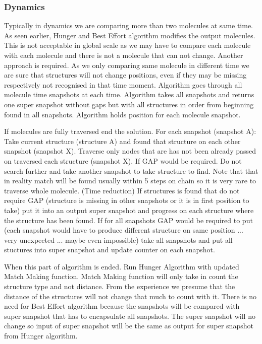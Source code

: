\documentclass[twocolumn]{bmcart}%
\begin{document}
\subsubsection{Dynamics}
Typically in dynamics we are comparing more than two molecules at same time. As seen earlier, Hunger and Best Effort algorithm modifies the output molecules. This is not acceptable in global scale as we may have to compare each molecule with each molecule and there is not a molecule that can not change. Another approach is required. As we only comparing same molecule in different time we are sure that structures will not change positions, even if they may be missing respectively not recognised in that time moment. Algorithm goes through all molecule time snapshots at each time. Algorithm takes all snapshots and returns one super snapshot without gaps but with all structures in order from beginning found in all snapshots. Algorithm holds position for each molecule snapshot.

If molecules are fully traversed end the solution.
For each snapshot (snapshot A):
Take current structure (structure A) and found that structure on each other snapshot (snapshot X). Traverse only nodes that are has not been already passed on traversed each structure (snapshot X). 
If GAP would be required. Do not search further and take another snapshot to take structure to find. Note that that in reality match will be found usually within 5 steps on chain so it is very rare to traverse whole molecule. (Time reduction)
If structures is found that do not require GAP (structure is missing in other snapshots or it is in first position to take) put it into an output super snapshot and progress on each structure where the structure has been found.
If for all snapshots GAP would be required to put (each snapshot would have to produce different structure on same position ... very unexpected ... maybe even impossible) take all snapshots and put all stuctures into super snapshot and update counter on each snapshot.

When this part of algorithm is ended. Run Hunger Algorithm with updated Match Making function. Match Making function will only take in count the structure type and not distance. From the experience we presume that the distance of the structures will not change that much to count with it. There is no need for Best Effort algorithm because the snapshots will be compared with super snapshot that has to encapsulate all snapshots. The super snapshot will no change so input of super snapshot will be the same as output for super snapshot from Hunger algorithm. 
\end{document}
